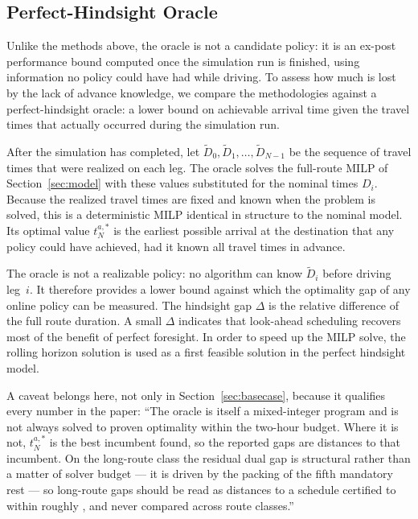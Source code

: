 \subsection{Perfect-Hindsight Oracle} \label{sec:oracle}
Unlike the methods above, the oracle is not a candidate policy: it is an ex-post performance bound computed once the simulation run is finished, using information no policy could have had while driving.
To assess how much is lost by the lack of advance knowledge, we compare the methodologies against a perfect-hindsight oracle: a lower bound on achievable arrival time given the travel times that actually occurred during the simulation run.

After the simulation has completed, let $\tilde{D}_0, \tilde{D}_1, \ldots, \tilde{D}_{N-1}$ be the sequence of travel times that were realized on each leg. The oracle solves the full-route MILP of Section~\ref{sec:model} with these values substituted for the nominal times $D_i$. Because the realized travel times are fixed and known when the problem is solved, this is a deterministic MILP identical in structure to the nominal model. Its optimal value $t^{a,*}_N$ is the earliest possible arrival at the destination that any policy could have achieved, had it known all travel times in advance.

The oracle is not a realizable policy: no algorithm can know $\tilde{D}_i$ before driving leg~$i$. It therefore provides a lower bound against which the optimality gap of any online policy can be measured.  The hindsight gap $\Delta$ is the relative difference of the full route duration. A small $\Delta$ indicates that look-ahead scheduling recovers most of the benefit of perfect foresight. In order to speed up the MILP solve, the rolling horizon solution is used as a first feasible solution in the perfect hindsight model.

\begin{anew}
A caveat belongs here, not only in Section~\ref{sec:basecase}, because it
qualifies every number in the paper: ``The oracle is itself a mixed-integer
program and is not always solved to proven optimality within the two-hour budget.
Where it is not, $t^{a,*}_N$ is the best incumbent found, so the reported gaps are
distances to that incumbent. On the long-route class the residual dual gap is
structural rather than a matter of solver budget --- it is driven by the packing of
the fifth mandatory rest --- so long-route gaps should be read as distances to a
schedule certified to within roughly , and never compared across route
classes.''
\end{anew}
